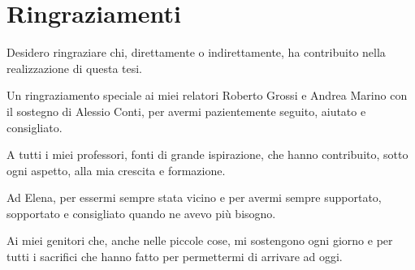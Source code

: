 

\chapter*{Ringraziamenti}


Desidero ringraziare chi, direttamente o indirettamente, ha contribuito nella realizzazione di questa tesi.\medskip

Un ringraziamento speciale ai miei relatori Roberto Grossi e Andrea Marino con il sostegno di Alessio Conti, per avermi pazientemente seguito, aiutato e consigliato.\medskip

A tutti i miei professori, fonti di grande ispirazione, che hanno contribuito, sotto ogni aspetto, alla mia crescita e formazione.\medskip

Ad Elena, per essermi sempre stata vicino e per avermi sempre supportato, sopportato e consigliato quando ne avevo più bisogno.\medskip

Ai miei genitori che, anche nelle piccole cose, mi sostengono ogni giorno e per tutti i sacrifici che hanno fatto per permettermi di arrivare ad oggi.\medskip

\noindent

\clearpage